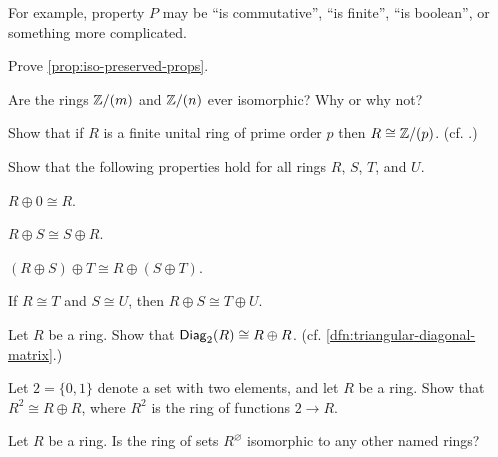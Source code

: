 For example, property \(P\) may be ``is commutative'', ``is finite'', ``is boolean'', or something more complicated.



\Exercises%

\begin{exercise}
Prove \autoref{prop:iso-preserved-props}.
\end{exercise}


\begin{exercise}
Are the rings \(\mathbb{Z}/(m)\) and \(\mathbb{Z}/(n)\) ever isomorphic?
Why or why not?
\end{exercise}


\begin{exercise}
Show that if \(R\) is a finite unital ring of prime order \(p\) then \(R \cong \mathbb{Z}/(p)\).
(cf. .)
\end{exercise}

\begin{exercise}\label{exerc:direct-sum-basics}
Show that the following properties hold for all rings \(R\), \(S\), \(T\), and \(U\).
\begin{proplist*}
\item \label{exerc:direct-sum-basics:zero} \(R \oplus 0 \cong R\).
\item \label{exerc:direct-sum-basics:comm} \(R \oplus S \cong S \oplus R\).
\item \label{exerc:direct-sum-basics:assoc} \((R \oplus S) \oplus T \cong R \oplus (S \oplus T)\).
\item \label{exerc:direct-sum-well-defined} If \(R \cong T\) and \(S \cong U\), then \(R \oplus S \cong T \oplus U\).
\end{proplist*}
\end{exercise}


\begin{exercise}
Let \(R\) be a ring.
Show that \(\mathsf{Diag}_{2}(R) \cong R \oplus R\).
(cf. \ref{dfn:triangular-diagonal-matrix}.)
\end{exercise}


\begin{exercise}
Let \(2 = \{ 0, 1 \}\) denote a set with two elements, and let \(R\) be a ring.
Show that \(R^2 \cong R \oplus R\), where \(R^2\) is the ring of functions \(2 \rightarrow R\).
\end{exercise}


\begin{exercise}
Let \(R\) be a ring.
Is the ring of sets \(R^\varnothing\) isomorphic to any other named rings?
\end{exercise}


